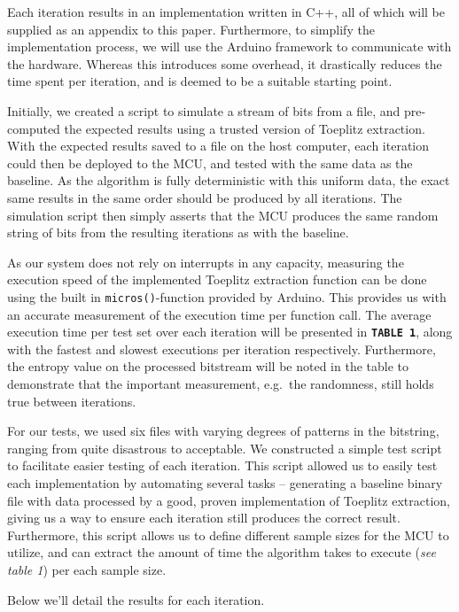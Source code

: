 \documentclass{sigchi}
\begin{document}
Each iteration results in an implementation written in C++, all of which will be supplied as an appendix to this paper. Furthermore, to simplify the implementation process, we will use the Arduino framework to communicate with the hardware. Whereas this introduces some overhead, it drastically reduces the time spent per iteration, and is deemed to be a suitable starting point.

Initially, we created a script to simulate a stream of bits from a file, and pre-computed the expected results using a trusted version of Toeplitz extraction. With the expected results saved to a file on the host computer, each iteration could then be deployed to the MCU, and tested with the same data as the baseline. As the algorithm is fully deterministic with this uniform data, the exact same results in the same order should be produced by all iterations. The simulation script then simply asserts that the MCU produces the same random string of bits from the resulting iterations as with the baseline.

As our system does not rely on interrupts in any capacity, measuring the execution speed of the implemented Toeplitz extraction function can be done using the built in \texttt{micros()}-function provided by Arduino. This provides us with an accurate measurement of the execution time per function call. The average execution time per test set over each iteration will be presented in \textbf{\texttt{TABLE\ 1}}, along with the fastest and slowest executions per iteration respectively. Furthermore, the entropy value on the processed bitstream will be noted in the table to demonstrate that the important measurement, e.g.~the randomness, still holds true between iterations.

For our tests, we used six files with varying degrees of patterns in the bitstring, ranging from quite disastrous to acceptable. We constructed a simple test script to facilitate easier testing of each iteration. This script allowed us to easily test each implementation by automating several tasks -- generating a baseline binary file with data processed by a good, proven implementation of Toeplitz extraction, giving us a way to ensure each iteration still produces the correct result. Furthermore, this script allows us to define different sample sizes for the MCU to utilize, and can extract the amount of time the algorithm takes to execute (\emph{see table 1}) per each sample size.

Below we'll detail the results for each iteration.
\end{document}
